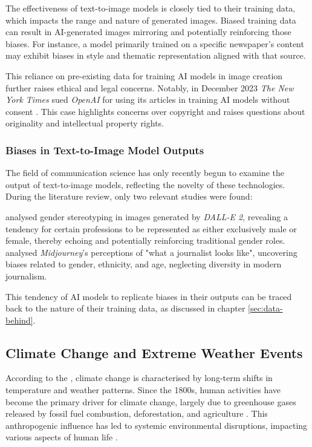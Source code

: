 The effectiveness of text-to-image models is closely tied to their training data, which impacts the range and nature of generated images. Biased training data can result in AI-generated images mirroring and potentially reinforcing those biases. For instance, a model primarily trained on a specific newspaper's content may exhibit biases in style and thematic representation aligned with that source.

This reliance on pre-existing data for training AI models in image creation further raises ethical and legal concerns. Notably, in December 2023 \textit{The New York Times} sued \textit{OpenAI} for using its articles in training AI models without consent \parencite{Miller2023}. This case highlights concerns over copyright and raises questions about originality and intellectual property rights.

\subsubsection{Biases in Text-to-Image Model Outputs}
The field of communication science has only recently begun to examine the output of text-to-image models, reflecting the novelty of these technologies. During the literature review, only two relevant studies were found:

\textcite{Garcia2023} analysed gender stereotyping in images generated by \textit{DALL-E 2}, revealing a tendency for certain professions to be represented as either exclusively male or female, thereby echoing and potentially reinforcing traditional gender roles. \textcite{Thomas2023} analysed \textit{Midjourney}'s perceptions of "what a journalist looks like", uncovering biases related to gender, ethnicity, and age, neglecting diversity in modern journalism.

This tendency of AI models to replicate biases in their outputs can be traced back to the nature of their training data, as discussed in chapter \ref{sec:data-behind}. 

\subsection{Climate Change and Extreme Weather Events}
\label{subsec:climate-change-and-extreme-weather}

According to the \textcite{UNClimateChange}, climate change is characterised by long-term shifts in temperature and weather patterns. Since the 1800s, human activities have become the primary driver for climate change, largely due to greenhouse gases released by fossil fuel combustion, deforestation, and agriculture \parencite{ipcc2023_wg2_1}. This anthropogenic influence has led to systemic environmental disruptions, impacting various aspects of human life \parencite{ipcc_2023_policy}.

